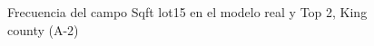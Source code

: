 \begin{figure}[H]
    \centering
    
    \caption{Frecuencia del campo Sqft lot15 en el modelo real y Top 2, King county (A-2)}
    \label{frecuency-top2-sqft lot15}
\end{figure}